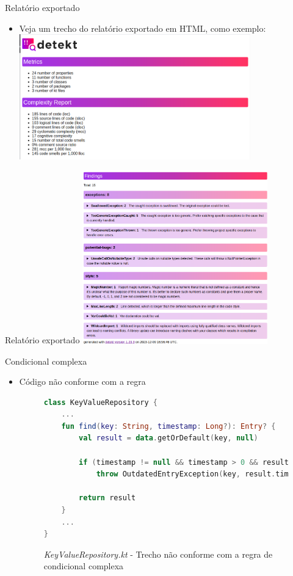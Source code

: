 \documentclass[brazilian]{beamer}
\begin{document}
\begin{frame}{Relatório exportado}
    \begin{itemize}
        \item Veja um trecho do relatório exportado em HTML, como exemplo:
        \centering
        \includegraphics[width=10cm]{report_overview}
    \end{itemize}
\end{frame}

\begin{frame}{Relatório exportado}
    \centering
    \includegraphics[height=7.5cm]{report_findings}
\end{frame}

\begin{frame}[fragile]{Condicional complexa}
    \begin{itemize}
        \item Código não conforme com a regra
        \begin{figure}[H]
            \centering
            \begin{lstlisting}[language=Kotlin]
class KeyValueRepository {
    ...
    fun find(key: String, timestamp: Long?): Entry? {
        val result = data.getOrDefault(key, null)

        if (timestamp != null && timestamp > 0 && result != null && result.timestamp < timestamp)
            throw OutdatedEntryException(key, result.timestamp)

        return result
    }
    ...
}
            \end{lstlisting}
            \caption{\textit{KeyValueRepository.kt} - Trecho não conforme com a regra de condicional complexa}
            \label{fig:detekt_complex_condition_before_example}
        \end{figure}
    \end{itemize}
\end{frame}
\end{document}
